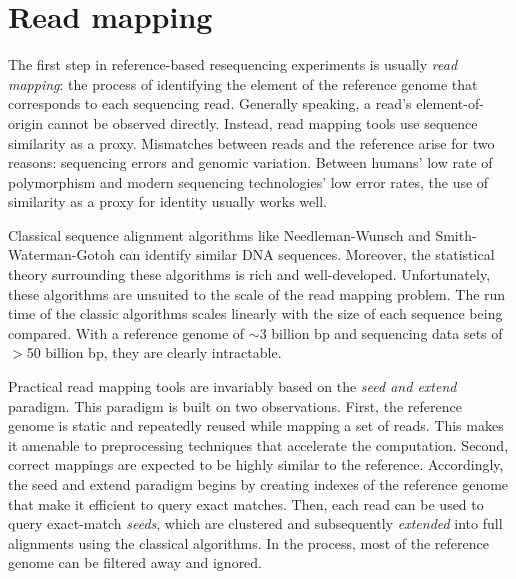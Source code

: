 \documentclass[11pt]{ucthesis}
\begin{document}
\section{Read mapping}

The first step in reference-based resequencing experiments is usually \emph{read mapping}: the process of identifying the element of the reference genome that corresponds to each sequencing read. Generally speaking, a read's element-of-origin cannot be observed directly. Instead, read mapping tools use sequence similarity as a proxy. Mismatches between reads and the reference arise for two reasons: sequencing errors and genomic variation. Between humans' low rate of polymorphism and modern sequencing technologies' low error rates, the use of similarity as a proxy for identity usually works well.

Classical sequence alignment algorithms like Needleman-Wunsch\cite{needleman1970general} and Smith-Waterman-Gotoh\cite{smith1981comparison,gotoh1982improved} can identify similar DNA sequences. Moreover, the statistical theory surrounding these algorithms is rich and well-developed\cite{karlin1990methods,states1991improved}. Unfortunately, these algorithms are unsuited to the scale of the read mapping problem. The run time of the classic algorithms scales linearly with the size of each sequence being compared. With a reference genome of $\sim$3 billion bp and sequencing data sets of $>$50 billion bp, they are clearly intractable.

Practical read mapping tools are invariably based on the \emph{seed and extend} paradigm. This paradigm is built on two observations. First, the reference genome is static and repeatedly reused while mapping a set of reads. This makes it amenable to preprocessing techniques that accelerate the computation. Second, correct mappings are expected to be highly similar to the reference. Accordingly, the seed and extend paradigm begins by creating indexes of the reference genome that make it efficient to query exact matches. Then, each read can be used to query exact-match \emph{seeds}, which are clustered and subsequently \emph{extended} into full alignments using the classical algorithms. In the process, most of the reference genome can be filtered away and ignored.
\end{document}
